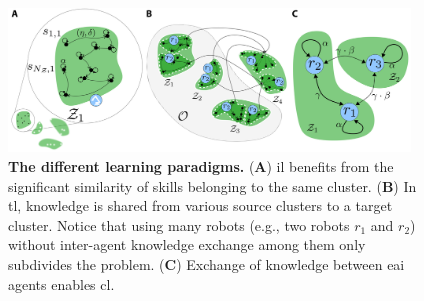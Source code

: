 \documentclass[12pt]{article}
\begin{document}

\begin{figure}[!t]
	\centering
	\includegraphics[width=0.95\textwidth]{fig/learning_paradigms_conceptual_figure.png}
	\caption{\label{fig:learning_paradigms_conceptual_figure} \textbf{The different learning paradigms.} (\textbf{A}) \Acl{il} benefits from the significant similarity of skills belonging to the same cluster. (\textbf{B}) In \acl{tl}, knowledge is shared from various source clusters to a target cluster. Notice that using many robots (e.g., two robots $r_1$ and $r_2$) without inter-agent knowledge exchange among them only subdivides the problem. (\textbf{C}) Exchange of knowledge between \ac{eai} agents enables \acl{cl}.}
\end{figure}
\end{document}
